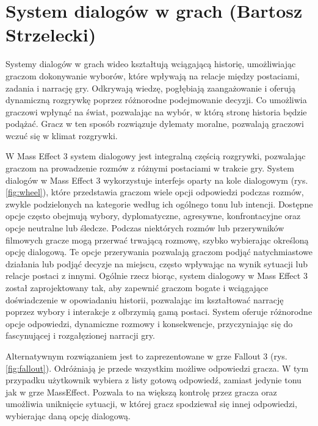 \section{System dialogów w grach (Bartosz Strzelecki)}\label{chap:dialogi}
Systemy dialogów w grach wideo kształtują wciągającą historię, umożliwiając graczom dokonywanie wyborów, które wpływają na relacje między postaciami, zadania i narrację gry. 
Odkrywają wiedzę, pogłębiają zaangażowanie i oferują dynamiczną rozgrywkę poprzez różnorodne podejmowanie decyzji.
Co umożliwia graczowi wpłynąć na świat, pozwalając na wybór, w którą stronę historia będzie podążać.
Gracz w ten sposób rozwiązuje dylematy moralne, pozwalają graczowi wczuć się w klimat rozgrywki.

W Mass Effect 3 system dialogowy jest integralną częścią rozgrywki, pozwalając graczom na prowadzenie rozmów z różnymi postaciami w trakcie gry.
System dialogów w Mass Effect 3 wykorzystuje interfejs oparty na kole dialogowym (rys. \ref{fig:wheel}), które
przedstawia graczom wiele opcji odpowiedzi podczas rozmów, zwykle podzielonych na kategorie według ich ogólnego tonu lub intencji.
Dostępne opcje często obejmują wybory, dyplomatyczne, agresywne, konfrontacyjne oraz opcje neutralne lub śledcze.
Podczas niektórych rozmów lub przerywników filmowych gracze mogą przerwać trwającą rozmowę, szybko wybierając określoną opcję dialogową.
Te opcje przerywania pozwalają graczom podjąć natychmiastowe działania lub podjąć decyzje na miejscu, często wpływając na wynik sytuacji lub relacje postaci z innymi.
Ogólnie rzecz biorąc, system dialogowy w Mass Effect 3 został zaprojektowany tak, aby zapewnić graczom bogate i wciągające doświadczenie w opowiadaniu historii,
pozwalając im kształtować narrację poprzez wybory i interakcje z olbrzymią gamą postaci. System oferuje różnorodne opcje odpowiedzi, dynamiczne rozmowy i konsekwencje,
przyczyniając się do fascynującej i rozgałęzionej narracji gry.

Alternatywnym rozwiązaniem jest to zaprezentowane w grze Fallout 3 (rys. \ref{fig:fallout}). Odróżniają je przede wszystkim możliwe odpowiedzi gracza.
W tym przypadku użytkownik wybiera z listy gotową odpowiedź, zamiast jedynie tonu jak w grze MassEffect. Pozwala to na większą kontrolę
przez gracza oraz umożliwia uniknięcie sytuacji, w której gracz spodziewał się innej odpowiedzi, wybierając daną opcję dialogową.

